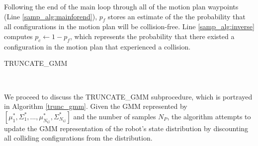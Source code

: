 \documentclass[journal]{IEEEtran}
\begin{document}
Following the end of the main loop through all of the motion plan waypoints (Line \ref{samp_alg:mainforend}), $p_f$ stores an estimate of the the probability that all configurations in the motion plan will be collision-free. Line \ref{samp_alg:inverse} computes $p_c \gets 1-p_f$, which represents the probability that there existed a configuration in the motion plan that experienced a collision.

\begin{algorithm}
  \caption{TRUNCATE\_GMM}
  \begin{algorithmic}[1]
     \label{trunc_alg:sample}
     \label{trunc_alg:collision_free}
    \STATE{$[F_{1},...,F_{N_G}]\gets [0,...,0]$} \label{trunc_alg:nocoll_counts}
     \label{trunc_alg:total_collcount}
     \label{trunc_alg:mainloop_begin}
    \ELSE
     \label{trunc_alg:chiupdate}
    \ENDIF
    \ENDFOR
    \ENDFOR \label{trunc_alg:mainloop_end}

     \label{trunc_alg:mean_covbegin}
     \label{trunc_alg:weightupdate}
    \ENDFOR \label{trunc_alg:mean_covend}

    \\%
  \end{algorithmic}
\label{trunc_gmm}
\end{algorithm}

We proceed to discuss the TRUNCATE\_GMM subprocedure, which is portrayed in Algorithm \ref{trunc_gmm}. Given the GMM represented by $[\mu_1^*,\Sigma_1^*,...,\mu_{N_G}^*,\Sigma_{N_G}^*]$ and the number of samples $N_P$, the algorithm attempts to update the GMM representation of the robot's state distribution by discounting all colliding configurations from the distribution.
\end{document}
